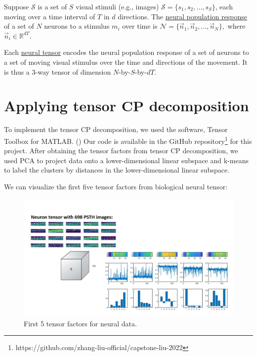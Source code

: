 \begin{defn}
    Suppose $\mathcal{S}$ is a set of $S$ visual stimuli (e.g., images) $\mathcal{S} = \{s_1, s_2,\dots, s_S\}$, each moving over a time interval of $T$ in $d$ directions. The \underline{neural population response} of a set of $N$ neurons to a stimulus $m_i$ over time is $\mathcal{N} = \{\vec{n}_1, \vec{n}_2, \dots, \vec{n}_N\},$ where $\vec{n}_i \in \mathbb{R}^{dT}$. 
\end{defn}
\begin{defn}
    Each \underline{neural tensor} encodes the neural population response of a set of neurons to a set of moving visual stimulus over the time and directions of the movement. It is thus a $3$-way tensor of dimension $N$-by-$S$-by-$dT$.
\end{defn}

\section{Applying tensor CP decomposition}
To implement the tensor CP decomposition, we used the software, Tensor Toolbox for MATLAB. (\cite{tensortoolbox}) Our code is available in the GitHub repository\footnote{https://github.com/zhang-liu-official/capstone-liu-2022} for this project. After obtaining the tensor factors from tensor CP decomposition, we used PCA to project data onto a lower-dimensional linear subspace and k-means to label the clusters by distances in the lower-dimensional linear subspace. 

We can visualize the first five tensor factors from biological neural tensor:
    \begin{figure}[H]
        \centering
            \includegraphics[width=\textwidth]{presentation/Slide3.jpg}
            \caption{First 5 tensor factors for neural data.}
        \end{figure} 

